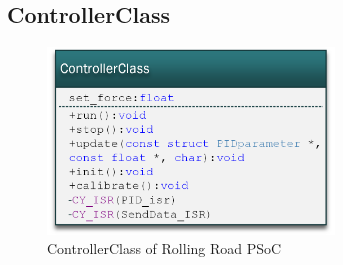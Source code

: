 \subsection{ControllerClass}

\begin{figure}[H]
	\centering
	\includegraphics [width=3in]{Software/Pictures/klassediagram_ControllerClass.png}
	\caption{ControllerClass of Rolling Road PSoC}
	\label{fig:Class_diagram_ControllerClass_RR_PSoC}
\end{figure}

